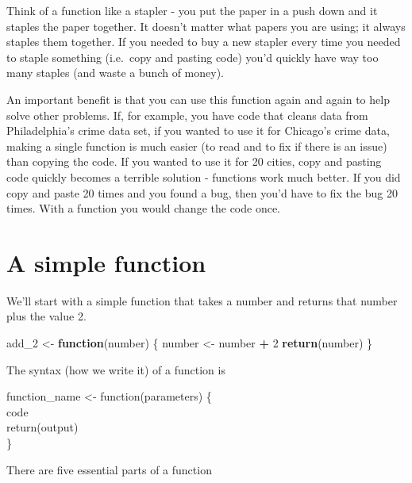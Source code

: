 \documentclass[
  12pt,
]{book}
\newenvironment{Shaded}{\begin{snugshade}}{\end{snugshade}}
\newcommand{\ControlFlowTok}[1]{\textcolor[rgb]{0.27,0.27,0.27}{\textbf{#1}}}
\newcommand{\DecValTok}[1]{\textcolor[rgb]{0.06,0.06,0.06}{#1}}
\newcommand{\KeywordTok}[1]{\textcolor[rgb]{0.27,0.27,0.27}{\textbf{#1}}}
\newcommand{\NormalTok}[1]{#1}
\newcommand{\OperatorTok}[1]{\textcolor[rgb]{0.43,0.43,0.43}{\textbf{#1}}}
\newcommand{\StringTok}[1]{\textcolor[rgb]{0.5,0.5,0.5}{#1}}
\begin{document}
Think of a function like a stapler - you put the paper in a push down and it staples the paper together. It doesn't matter what papers you are using; it always staples them together. If you needed to buy a new stapler every time you needed to staple something (i.e.~copy and pasting code) you'd quickly have way too many staples (and waste a bunch of money).

An important benefit is that you can use this function again and again to help solve other problems. If, for example, you have code that cleans data from Philadelphia's crime data set, if you wanted to use it for Chicago's crime data, making a single function is much easier (to read and to fix if there is an issue) than copying the code. If you wanted to use it for 20 cities, copy and pasting code quickly becomes a terrible solution - functions work much better. If you did copy and paste 20 times and you found a bug, then you'd have to fix the bug 20 times. With a function you would change the code once.

\hypertarget{a-simple-function}{%
\section{A simple function}\label{a-simple-function}}

We'll start with a simple function that takes a number and returns that number plus the value 2.

\begin{Shaded}
\begin{Highlighting}[]
\NormalTok{add\_}\DecValTok{2}\NormalTok{ \textless{}{-}}\StringTok{ }\ControlFlowTok{function}\NormalTok{(number) \{}
\NormalTok{  number \textless{}{-}}\StringTok{ }\NormalTok{number }\OperatorTok{+}\StringTok{ }\DecValTok{2}
  \KeywordTok{return}\NormalTok{(number)}
\NormalTok{\}}
\end{Highlighting}
\end{Shaded}

The syntax (how we write it) of a function is

function\_name \textless- function(parameters)
\{\\
code\\
return(output)\\
\}

There are five essential parts of a function
\end{document}
